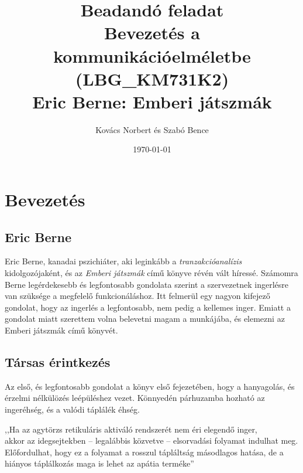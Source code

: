 \documentclass[a4paper,12pt]{article}
\begin{document}
	\pagestyle{fancy}
	\fancyhf{}
	\fancyhead[LE,RO]{\normalfont\normalsize\thepage}
	\fancyhead[RE]{\nouppercase{\sffamily\small\leftmark}}
	\fancyhead[LO]{\nouppercase{\sffamily\small\rightmark}}
	
	\title{{\Large Beadandó feladat} \\Bevezetés a kommunikációelméletbe  \\ {\small (LBG\_KM731K2)} \\[1cm] {\huge Eric Berne: Emberi játszmák}}
	
	\author{Kovács Norbert és Szabó Bence}
	
	\date{\today}
	\maketitle
	
	\newpage
	
	\section{Bevezetés}
	\subsection*{Eric Berne}
	Eric Berne, kanadai pszichiáter, aki leginkább a \textit{tranzakcióanalízis} kidolgozójaként, és az \textit{Emberi játszmák} című könyve révén vált híressé.
	Számomra Berne legérdekesebb és legfontosabb gondolata szerint a szervezetnek ingerlésre van szüksége a megfelelő funkcionáláshoz. Itt felmerül egy nagyon kifejező gondolat, hogy az ingerlés a legfontosabb, nem pedig a kellemes inger. Emiatt a gondolat miatt szerettem volna belevetni magam a munkájába, és elemezni az Emberi játszmák című könyvét.
	
	\subsection{Társas érintkezés}
	Az első, és legfontosabb gondolat a könyv első fejezetében, hogy a hanyagolás, és érzelmi nélkülözés leépüléshez vezet. Könnyedén párhuzamba hozható az ingeréhség, és a valódi táplálék éhség. 

	\begin{flushright}
		{\footnotesize 		,,Ha az agytörzs retikuláris aktiváló rendszerét nem éri elegendő inger,\\ akkor az idegsejtekben -- legalábbis közvetve -- elsorvadási folyamat indulhat meg. Előfordulhat, hogy ez a folyamat a rosszul tápláltság másodlagos hatása, de a hiányos táplálkozás maga is lehet az apátia terméke''}
	\end{flushright}
\end{document}
